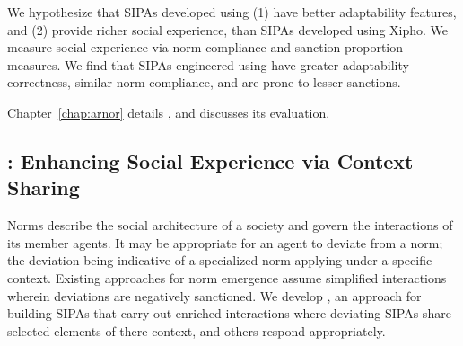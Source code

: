 We hypothesize that SIPAs developed using \frameworkA (1) have better
adaptability features, and (2) provide richer social experience, than
SIPAs developed using Xipho. We measure social experience via norm
compliance and sanction proportion measures. We find that SIPAs
engineered using \frameworkA have greater adaptability correctness,
similar norm compliance, and are prone to lesser sanctions.

Chapter~\ref{chap:arnor} details \frameworkA, and discusses its evaluation. 

\subsection[Enhancing Social Experience via Context Sharing]{\frameworkB: Enhancing Social Experience via Context Sharing}



Norms describe the social architecture of a society
and govern the interactions of its member agents.
It may be appropriate for an agent to deviate from
a norm; the deviation being indicative of a specialized
norm applying under a specific context. Existing
approaches for norm emergence assume simplified
interactions wherein deviations are negatively
sanctioned. We develop \frameworkB, an approach for
building SIPAs that carry out enriched interactions
where deviating SIPAs share selected elements of there 
context, and others respond appropriately.

